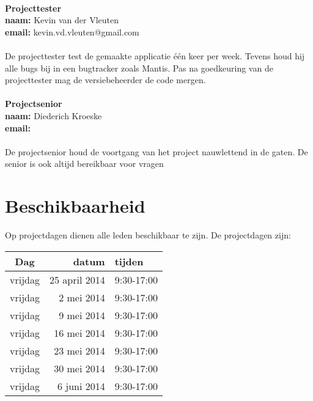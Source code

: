 \\
\textbf{Projecttester}\\
\textbf{naam:}	Kevin van der Vleuten\\
\textbf{email:}	kevin.vd.vleuten@gmail.com\\
\\
De projecttester test de gemaakte applicatie één keer per week. Tevens houd hij alle bugs bij in een bugtracker zoals Mantis. Pas na goedkeuring van de projecttester mag de versiebeheerder de code mergen.\\
\\
\textbf{Projectsenior}\\
\textbf{naam:}	Diederich Kroeske\\
\textbf{email:}	\\
\\
De projectsenior houd de voortgang van het project nauwlettend in de gaten. De senior is ook altijd bereikbaar voor vragen\\

\section{Beschikbaarheid} \label{sec:typesetting}
Op projectdagen dienen alle leden beschikbaar te zijn. De projectdagen zijn:
\begin{table}[h]
  \label{tb:table}
  \begin{tabular}{crl}
    \toprule
    Dag     & 			datum & 		tijden    \\
    \midrule
    vrijdag     & 25 	april 	2014   & 9:30-17:00\\
    vrijdag     & 2 	mei 	2014   & 9:30-17:00\\
    vrijdag     & 9 	mei 	2014   & 9:30-17:00\\
    vrijdag     & 16 	mei 	2014   & 9:30-17:00\\
    vrijdag     & 23 	mei 	2014   & 9:30-17:00\\
    vrijdag     & 30 	mei 	2014   & 9:30-17:00\\
    vrijdag     & 6 	juni 	2014   & 9:30-17:00\\
    \bottomrule
  \end{tabular}
\end{table}